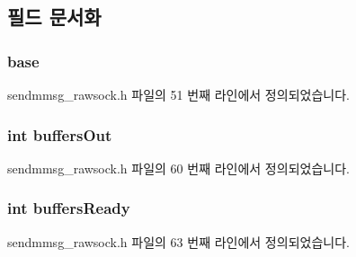 \subsection{필드 문서화}
\subsubsection[{\texorpdfstring{base}{base}}]{ base}\hypertarget{structsendmmsg__rawsock__t_a1507c5af4508d59cb0a730a852763e94}{}\label{structsendmmsg__rawsock__t_a1507c5af4508d59cb0a730a852763e94}


sendmmsg\+\_\+rawsock.\+h 파일의 51 번째 라인에서 정의되었습니다.

\subsubsection[{\texorpdfstring{buffers\+Out}{buffersOut}}]{\setlength{\rightskip}{0pt plus 5cm}int buffers\+Out}\hypertarget{structsendmmsg__rawsock__t_aeda5b51f8dc77d9f2012426b2e4d87aa}{}\label{structsendmmsg__rawsock__t_aeda5b51f8dc77d9f2012426b2e4d87aa}


sendmmsg\+\_\+rawsock.\+h 파일의 60 번째 라인에서 정의되었습니다.

\subsubsection[{\texorpdfstring{buffers\+Ready}{buffersReady}}]{\setlength{\rightskip}{0pt plus 5cm}int buffers\+Ready}\hypertarget{structsendmmsg__rawsock__t_a06dd59c797f7aa0ca9f888304888f2a0}{}\label{structsendmmsg__rawsock__t_a06dd59c797f7aa0ca9f888304888f2a0}


sendmmsg\+\_\+rawsock.\+h 파일의 63 번째 라인에서 정의되었습니다.

